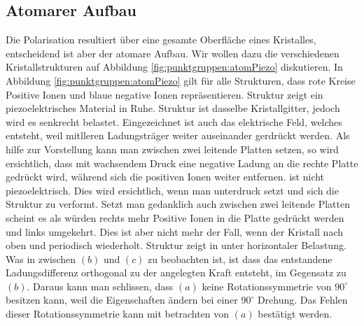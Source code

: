 \subsection{Atomarer Aufbau}
Die Polarisation resultiert über eine gesamte Oberfläche eines Kristalles, entscheidend ist aber der atomare Aufbau.
Wir wollen dazu die verschiedenen Kristallstrukturen auf Abbildung \ref{fig:punktgruppen:atomPiezo} diskutieren.
In Abbildung \ref{fig:punktgruppen:atomPiezo} gilt für alle Strukturen, dass rote Kreise Positive Ionen und blaue negative Ionen repräsentieren. 
Struktur  zeigt ein piezoelektrisches Material in Ruhe. Struktur  ist dasselbe Kristallgitter, jedoch wird es senkrecht belastet. 
Eingezeichnet ist auch das elektrische Feld, welches entsteht, weil mitlleren Ladungsträger weiter auseinander gerdrückt werden.
Als hilfe zur Vorstellung kann man  zwischen zwei leitende Platten setzen, so wird ersichtlich, dass mit wachsendem Druck eine negative Ladung an die rechte Platte gedrückt wird, während sich die positiven Ionen weiter entfernen. 
 ist nicht piezoelektrisch.
Dies wird ersichtlich, wenn man  unterdruck setzt und sich die Struktur zu  verformt.
Setzt man  gedanklich auch zwischen zwei leitende Platten scheint es als würden rechts mehr Positive Ionen in die Platte gedrückt werden und links umgekehrt.
Dies ist aber nicht mehr der Fall, wenn der Kristall nach oben und periodisch wiederholt.
Struktur  zeigt  in unter horizontaler Belastung. 
Was in zwischen $(b)$ und $(c)$ zu beobachten ist, ist dass das entstandene Ladungsdifferenz orthogonal zu der angelegten Kraft entsteht, im Gegensatz zu $(b)$.
Daraus kann man schlissen, dass $(a)$ keine Rotationssymmetrie von $90^\circ$ besitzen kann, weil die Eigenschaften ändern bei einer $90^\circ$ Drehung. 
Das Fehlen dieser Rotationssymmetrie kann mit betrachten von $(a)$ bestätigt werden. 

